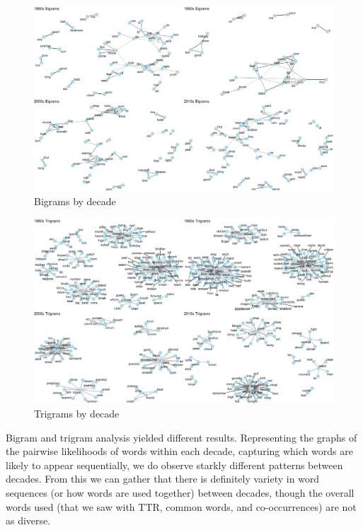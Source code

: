 \documentclass[
  authoryear,
  preprint]{elsarticle}
\begin{document}
\begin{figure}[H]

{\centering \includegraphics{images/bi4-imageonline.co-merged(1)-imageonline.co-merged(1).png}

}

\caption{Bigrams by decade}

\end{figure}%
\begin{figure}[H]

{\centering \includegraphics{images/tri4-imageonline.co-merged-imageonline.co-merged.png}

}

\caption{Trigrams by decade}

\end{figure}%

Bigram and trigram analysis yielded different results. Representing the
graphs of the pairwise likelihoods of words within each decade,
capturing which words are likely to appear sequentially, we do observe
starkly different patterns between decades. From this we can gather that
there is definitely variety in word sequences (or how words are used
together) between decades, though the overall words used (that we saw
with TTR, common words, and co-occurrences) are not as diverse.~
\end{document}
